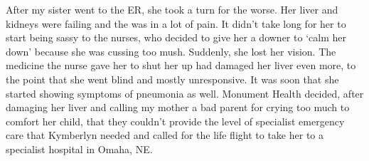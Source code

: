 \documentclass[12pt, letterpaper]{article}
\begin{document}
\begin{flushleft}
After my sister went to the ER, she took a turn for the worse.
Her liver and kidneys were failing and the was in a lot of pain.
It didn't take long for her to start being sassy to the nurses, 
who decided to give her a downer to `calm her down' because she was cussing too mush.
Suddenly, she lost her vision.
The medicine the nurse gave her to shut her up had damaged her liver even more,
to the point that she went blind and mostly unresponsive.
It was soon that she started showing symptoms of pneumonia as well.
Monument Health decided, after damaging her liver and calling my mother
a bad parent for crying too much to comfort her child, that they couldn't 
provide the level of specialist emergency care that Kymberlyn needed and 
called for the life flight to take her to a specialist hospital in Omaha, NE\@.
\vspace{5mm}



\end{flushleft}
\end{document}

